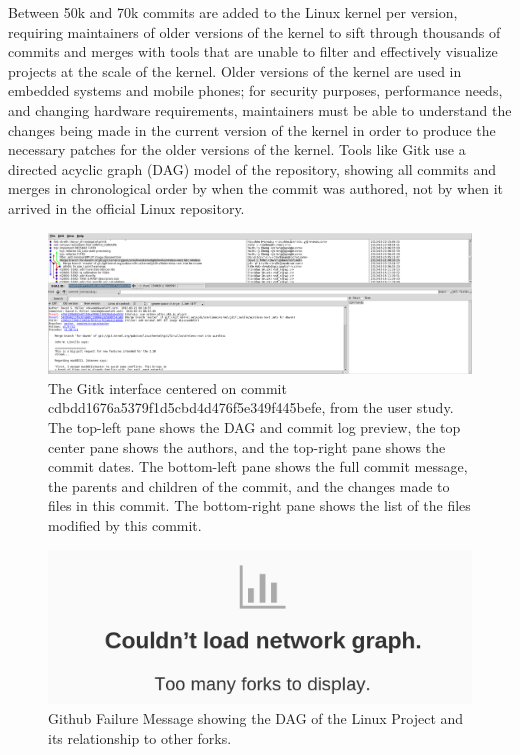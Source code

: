 
Between 50k and 70k commits are added to the Linux kernel per version,
requiring maintainers of older versions of the kernel to sift through
thousands of commits and merges with tools that are unable to filter and
effectively visualize projects at the scale of the kernel. Older
versions of the kernel are used in embedded systems and mobile phones;
for security purposes, performance needs, and changing hardware
requirements, maintainers must be able to understand the changes being
made in the current version of the kernel in order to produce the
necessary patches for the older versions of the kernel. Tools like Gitk
use a directed acyclic graph (DAG) model of the repository, showing all
commits and merges in chronological order by when the commit was
authored, not by when it arrived in the official Linux repository.

\begin{figure}
        \centering
        \includegraphics[width=0.97\linewidth]{figures/gitk.png}
        \caption{The Gitk interface centered on commit
          cdbdd1676a5379f1d5cbd4d476f5e349f445befe, \comB from the user
          study. The top-left pane shows the DAG and commit log preview,
          the top center pane shows the authors, and the top-right
          pane shows the commit dates. The bottom-left pane shows the
          full commit message, the parents and children of the commit,
          and the changes made to files in this commit. The bottom-right
          pane shows the list of the files modified by this commit.}
        \label{fig:gitk}
\end{figure}

\begin{figure}
        \centering
        \includegraphics[width=0.8\linewidth]{figures/github_viewer.png}
        \caption{Github Failure Message showing the DAG of the Linux Project and its
                relationship to other forks.}
        \label{fig:gitfail}
\end{figure}

